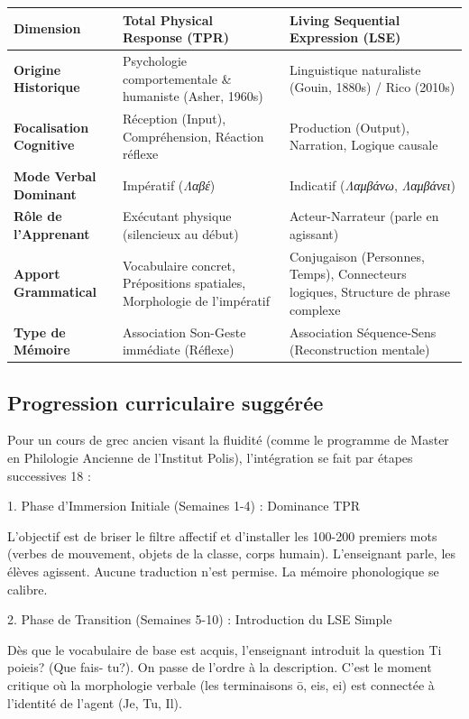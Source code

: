\begin{table}[h!]\small\centering\begin{tabular}{| p{2.3cm} | p{3.5cm} | p{3.5cm} |}\hline\textbf{Dimension} & \textbf{Total Physical Response (TPR)} & \textbf{Living Sequential Expression (LSE)} \\ \hline\textbf{Origine Historique} & Psychologie comportementale \& humaniste (Asher, 1960s) & Linguistique naturaliste (Gouin, 1880s) / Rico (2010s) \\ \hline\textbf{Focalisation Cognitive} & Réception (Input), Compréhension, Réaction réflexe & Production (Output), Narration, Logique causale \\ \hline\textbf{Mode Verbal Dominant} & Impératif (\textit{Λαβέ}) & Indicatif (\textit{Λαμβάνω}, \textit{Λαμβάνει}) \\ \hline\textbf{Rôle de l'Apprenant} & Exécutant physique (silencieux au début) & Acteur-Narrateur (parle en agissant) \\ \hline\textbf{Apport Grammatical} & Vocabulaire concret, Prépositions spatiales, Morphologie de l'impératif & Conjugaison (Personnes, Temps), Connecteurs logiques, Structure de phrase complexe \\ \hline\textbf{Type de Mémoire} & Association Son-Geste immédiate (Réflexe) & Association Séquence-Sens (Reconstruction mentale) \\ \hline\end{tabular}\end{table}

\subsection{Progression curriculaire suggérée}

Pour un cours de grec ancien visant la fluidité (comme le programme de Master en Philologie Ancienne
de l'Institut Polis), l'intégration se fait par étapes successives 18 :

1. Phase d'Immersion Initiale (Semaines 1-4) : Dominance TPR

L'objectif est de briser le filtre affectif et d'installer les 100-200 premiers mots (verbes de
mouvement, objets de la classe, corps humain). L'enseignant parle, les élèves agissent. Aucune
traduction n'est permise. La mémoire phonologique se calibre.

2. Phase de Transition (Semaines 5-10) : Introduction du LSE Simple

Dès que le vocabulaire de base est acquis, l'enseignant introduit la question Ti poieis? (Que fais-
tu?). On passe de l'ordre à la description. C'est le moment critique où la morphologie verbale (les
terminaisons \-ō, \-eis, \-ei) est connectée à l'identité de l'agent (Je, Tu, Il).

